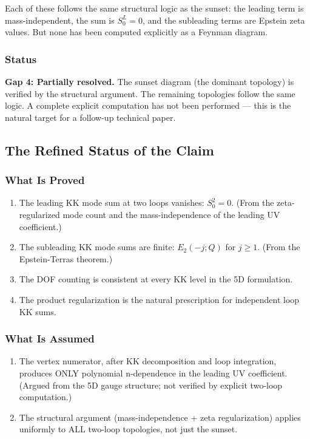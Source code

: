 \documentclass[aps,prd,preprint,superscriptaddress,longbibliography,floatfix]{revtex4-2}
\theoremstyle{remark}
\begin{document}
Each of these follows the same structural logic as the sunset: the leading term is mass-independent, the sum is $S_{0}^L = 0$, and the subleading terms are Epstein zeta values. But none has been computed explicitly as a Feynman diagram.


\subsubsection{Status}

\textbf{Gap 4: Partially resolved.} The sunset diagram (the dominant topology) is verified by the structural argument. The remaining topologies follow the same logic. A complete explicit computation has not been performed --- this is the natural target for a follow-up technical paper.



\subsection{The Refined Status of the Claim}


\subsubsection{What Is Proved}


\begin{enumerate}
  \item The leading KK mode sum at two loops vanishes: $S_{0}^{2} = 0$. (From the zeta-regularized mode count and the mass-independence of the leading UV coefficient.)
  \item The subleading KK mode sums are finite: $E_{2}(-j; Q)$ for $j \geq 1$. (From the Epstein-Terras theorem.)
  \item The DOF counting is consistent at every KK level in the 5D formulation.
  \item The product regularization is the natural prescription for independent loop KK sums.
\end{enumerate}


\subsubsection{What Is Assumed}


\begin{enumerate}
  \item The vertex numerator, after KK decomposition and loop integration, produces ONLY polynomial n-dependence in the leading UV coefficient. (Argued from the 5D gauge structure; not verified by explicit two-loop computation.)
  \item The structural argument (mass-independence + zeta regularization) applies uniformly to ALL two-loop topologies, not just the sunset.
\end{enumerate}
\end{document}
